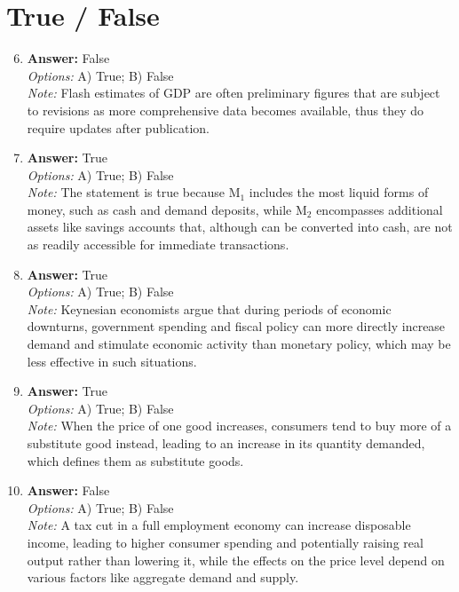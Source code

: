 \documentclass[12pt]{article}
\begin{document}
\section*{True / False}
\begin{enumerate}[label=\arabic*.]
\setcounter{enumi}{5}
\item \textbf{Answer:} False
\\ \textit{Options:} A) True; B) False
\\ \textit{Note:} Flash estimates of GDP are often preliminary figures that are subject to revisions as more comprehensive data becomes available, thus they do require updates after publication.
\item \textbf{Answer:} True
\\ \textit{Options:} A) True; B) False
\\ \textit{Note:} The statement is true because M$_{1}$ includes the most liquid forms of money, such as cash and demand deposits, while M$_{2}$ encompasses additional assets like savings accounts that, although can be converted into cash, are not as readily accessible for immediate transactions.
\item \textbf{Answer:} True
\\ \textit{Options:} A) True; B) False
\\ \textit{Note:} Keynesian economists argue that during periods of economic downturns, government spending and fiscal policy can more directly increase demand and stimulate economic activity than monetary policy, which may be less effective in such situations.
\item \textbf{Answer:} True
\\ \textit{Options:} A) True; B) False
\\ \textit{Note:} When the price of one good increases, consumers tend to buy more of a substitute good instead, leading to an increase in its quantity demanded, which defines them as substitute goods.
\item \textbf{Answer:} False
\\ \textit{Options:} A) True; B) False
\\ \textit{Note:} A tax cut in a full employment economy can increase disposable income, leading to higher consumer spending and potentially raising real output rather than lowering it, while the effects on the price level depend on various factors like aggregate demand and supply.
\end{enumerate}
\end{document}
